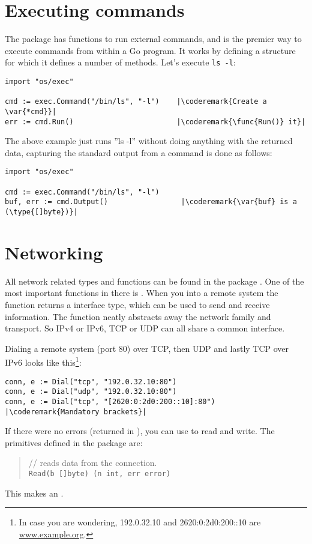 \section{Executing commands}
The  package has functions to run external commands, and is the premier way to
execute commands from within a Go program. It works by defining a  structure for which it
defines a number of methods.
Let's execute \verb|ls -l|:
\begin{lstlisting}
import "os/exec"

cmd := exec.Command("/bin/ls", "-l")    |\coderemark{Create a \var{*cmd}}|
err := cmd.Run()                        |\coderemark{\func{Run()} it}|
\end{lstlisting}
The above example just runs ''ls -l'' without doing anything with the returned data,
capturing the standard output from a command is done as follows:
\begin{lstlisting}
import "os/exec"

cmd := exec.Command("/bin/ls", "-l")
buf, err := cmd.Output()                 |\coderemark{\var{buf} is a (\type{[]byte})}|
\end{lstlisting}

\section{Networking}
All network related types and functions can be found in the package . One of the
most important functions in there is . When you 
into a remote system the function returns a  interface type, which can be used
to send and receive information. The function  neatly abstracts away the network
family and transport. So IPv4 or IPv6, TCP or UDP can all share a common interface. 

Dialing a remote system (port 80) over TCP, then UDP and lastly TCP over IPv6 looks
like this\footnote{In case
you are wondering, 192.0.32.10 and 2620:0:2d0:200::10 are \url{www.example.org}.}:
\begin{lstlisting}
conn, e := Dial("tcp", "192.0.32.10:80")
conn, e := Dial("udp", "192.0.32.10:80")
conn, e := Dial("tcp", "[2620:0:2d0:200::10]:80") |\coderemark{Mandatory brackets}|
\end{lstlisting}

If there were no errors (returned in ), you can use  to read and write.
The primitives defined in the package  are:
\begin{quote}
//  reads data from the connection.\\
\lstinline{Read(b []byte) (n int, err error)}
\end{quote}
This makes  an .

